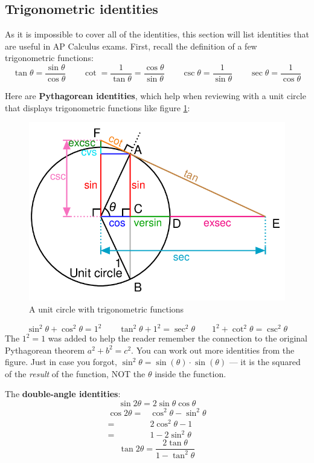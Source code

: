 \subsection{Trigonometric identities}
As it is impossible to cover all of the identities, this section will list identities that are useful in AP Calculus exams. First, recall the definition of a few trigonometric functions:
\begin{equation}
    \tan\theta = \frac{\sin\theta}{\cos\theta}
    \qquad
    \cot = \frac{1}{\tan\theta} = \frac{\cos\theta}{\sin\theta}
    \qquad
    \csc\theta = \frac{1}{\sin\theta}
    \qquad
    \sec\theta = \frac{1}{\cos\theta}
\end{equation}

Here are \textbf{Pythagorean identities}, which help when reviewing with a unit circle that displays trigonometric functions like figure \ref{fig:m8}:
\begin{figure}
    \centering
    \includegraphics[width=0.75\linewidth]{math/8.png}
    \caption{A unit circle with trigonometric functions}
    \label{fig:m8}
\end{figure}
\begin{equation}
    \sin^2\theta + \cos^2\theta = 1^2
    \qquad
    \tan^2\theta + 1^2 = \sec^2\theta
    \qquad
    1^2 + \cot^2\theta = \csc^2\theta
\end{equation}
The $1^2=1$ was added to help the reader remember the connection to the original Pythagorean theorem $a^2+b^2=c^2$. You can work out more identities from the figure. Just in case you forgot, $\sin^2\theta=\sin(\theta)\cdot\sin(\theta)$ — it is the squared of the \textit{result} of the function, NOT the $\theta$ inside the function.

The \textbf{double-angle identities}:
\begin{equation}
    \sin2\theta = 2 \sin\theta \cos\theta
\end{equation}
\begin{equation}\begin{aligned}
    \cos2\theta
    =& \cos^2\theta - \sin^2\theta \\
    =& 2\cos^2\theta - 1 \\
    =& 1 - 2\sin^2\theta
\end{aligned}\end{equation}
\begin{equation}
    \tan2\theta = \frac{2\tan\theta}{1 - \tan^2\theta}
\end{equation}

